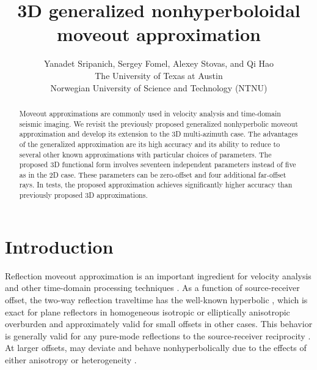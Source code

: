 
\title{3D generalized nonhyperboloidal moveout approximation}
\author{Yanadet Sripanich\footnotemark[1], Sergey Fomel\footnotemark[1], Alexey Stovas\footnotemark[2], and Qi Hao\footnotemark[2] \\
\footnotemark[1] The University of Texas at Austin \\ 
\footnotemark[2] Norwegian University of Science and Technology (NTNU)
}

\address{
Bureau of Economic Geology \\
John A. and Katherine G. Jackson School of Geosciences \\
The University of Texas at Austin \\
University Station, Box X \\
Austin, TX 78713-8924 
}
\maketitle


\begin{abstract}
Moveout approximations are commonly used in velocity analysis and time-domain seismic imaging. We revisit the previously proposed generalized nonhyperbolic moveout approximation and develop its extension to the 3D multi-azimuth case. The advantages of the generalized approximation are its high accuracy and its ability to reduce to several other known approximations with particular choices of parameters. The proposed 3D functional form involves seventeen independent parameters instead of five as in the 2D case. These parameters can be  zero-offset  and four additional far-offset rays. In  tests, the proposed approximation achieves significantly higher accuracy than previously proposed 3D approximations. 
\end{abstract}

\section{Introduction}
Reflection moveout approximation is an important ingredient for velocity analysis and other time-domain processing techniques \cite[]{yilmaz}. As a function of source-receiver offset, the two-way reflection traveltime has the well-known hyperbolic , which is exact for plane reflectors in homogeneous isotropic or elliptically anisotropic overburden and approximately valid for small offsets in other cases. This behavior is generally valid for any pure-mode reflections  to the source-receiver reciprocity \cite[]{thomsenbook}. At larger offsets,  may deviate  and behave nonhyperbolically due to the effects of either anisotropy or heterogeneity \cite[]{fomelnonhyper}. 

